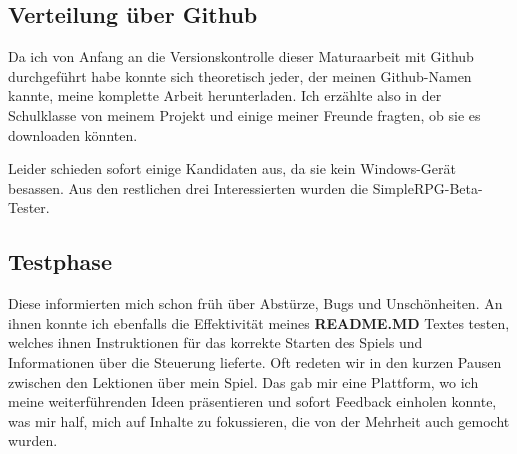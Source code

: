 \subsection{Verteilung über Github}

Da ich von Anfang an die Versionskontrolle dieser Maturaarbeit mit Github durchgeführt habe konnte sich theoretisch jeder, der meinen Github-Namen kannte, meine komplette Arbeit herunterladen.\cite{csomormaturaarbeit19github}
Ich erzählte also in der Schulklasse von meinem Projekt und einige meiner Freunde fragten, ob sie es downloaden könnten.

Leider schieden sofort einige Kandidaten aus, da sie kein Windows-Gerät besassen. Aus den restlichen drei Interessierten wurden die SimpleRPG-Beta-Tester.

\subsection{Testphase}

Diese informierten mich schon früh über Abstürze, Bugs und Unschönheiten.
An ihnen konnte ich ebenfalls die Effektivität meines \textbf{README.MD} Textes testen, welches ihnen Instruktionen für das korrekte Starten des Spiels und Informationen über die Steuerung lieferte.
Oft redeten wir in den kurzen Pausen zwischen den Lektionen über mein Spiel.
Das gab mir eine Plattform, wo ich meine weiterführenden Ideen präsentieren und sofort Feedback einholen konnte, was mir half, mich auf Inhalte zu fokussieren, die von der Mehrheit auch gemocht wurden.


